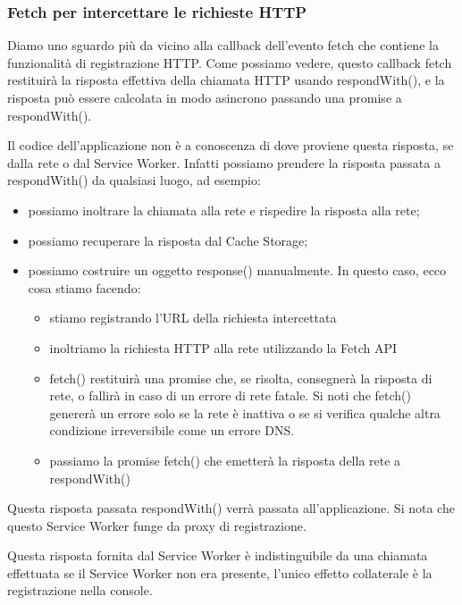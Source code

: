 \documentclass[italian]{article}
\begin{document}
\subsubsection{Fetch per intercettare le richieste HTTP}
Diamo uno sguardo più da vicino alla callback dell'evento fetch che contiene la funzionalità di registrazione HTTP. Come possiamo vedere, questo callback fetch restituirà la risposta effettiva della chiamata HTTP usando respondWith(), e la risposta può essere calcolata in modo asincrono passando una promise a respondWith().

Il codice dell'applicazione non è a conoscenza di dove proviene questa risposta, se dalla rete o dal Service Worker. Infatti possiamo prendere la risposta passata a respondWith() da qualsiasi luogo, ad esempio:
\begin{itemize}
\item possiamo inoltrare la chiamata alla rete e rispedire la risposta alla rete;
\item possiamo recuperare la risposta dal Cache Storage;
\item possiamo costruire un oggetto response() manualmente. 
	In questo caso, ecco cosa stiamo facendo:
	\begin{itemize}
	\item stiamo registrando l'URL della richiesta intercettata
	\item inoltriamo la richiesta HTTP alla rete utilizzando la Fetch API
	\item fetch() restituirà una promise che, se risolta, consegnerà la risposta di rete, o fallirà in caso di un errore di rete fatale. Si noti che fetch() genererà un errore solo se la rete è inattiva o se si verifica qualche altra condizione irreversibile come un errore DNS.
	\item passiamo la promise fetch() che emetterà la risposta della rete a respondWith()
	\end{itemize}
\end{itemize}

Questa risposta passata respondWith() verrà passata all'applicazione. Si nota che questo Service Worker funge da proxy di registrazione.

Questa risposta fornita dal Service Worker è indistinguibile da una chiamata effettuata se il Service Worker non era presente, l'unico effetto collaterale è la registrazione nella console.
\end{document}
